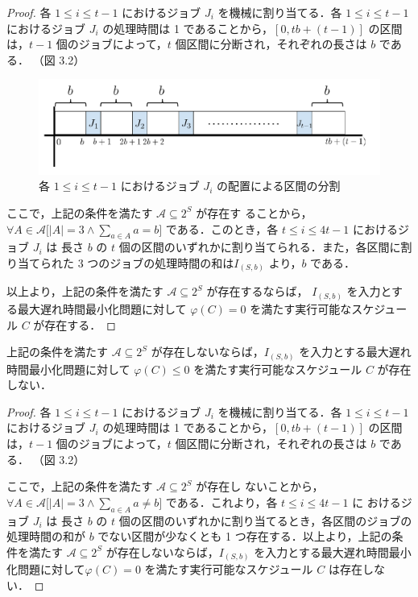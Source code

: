 \documentclass[12pt]{optlab-bachelor}
\begin{document}
\begin{proof}
  各 $1 \le i \le t - 1$ におけるジョブ $J_i$ を機械に割り当てる．各 $1 \le i \le t - 1$ におけるジョブ $J_i$ の処理時間は 1 であることから，$[0, tb + (t - 1)]$ の区間は，$t - 1$ 個のジョブによって，$t$ 個区間に分断され，それぞれの長さは $b$ である．
  （図 3.2）
  \begin{figure}[h]
    \centering
    \includegraphics[width = 14cm]{figure/Lmax.pdf}
    \caption{各 $1 \le i \le t - 1$ におけるジョブ $J_i$ の配置による区間の分割}
  \end{figure}

  ここで，上記の条件を満たす $\mathcal{A} \subseteq 2^S$ が存在す
  ることから，$\forall A \in \mathcal{A}\big[|A| = 3 \land \sum_{a \in
  A}a = b \big]$ である．このとき，各 $t \le i \le 4t - 1$ におけるジョブ $J_{i}$ は 長さ $b$ の $t$ 個の区間のいずれかに割り当てられる．また，各区間に割り当てられた 3 つのジョブの処理時間の和は$I_{(S,b)}$ より，$b$ である．

  以上より，上記の条件を満たす $\mathcal{A} \subseteq 2^S$ が存在するならば，
  $I_{(S,b)}$ を入力とする最大遅れ時間最小化問題に対して $\varphi(C) =
  0$ を満たす実行可能なスケジュール $C$ が存在する．
\end{proof}

\begin{lemma}\label{l_4}
  上記の条件を満たす $\mathcal{A} \subseteq 2^S$ が存在しないならば，$I_{(S,b)}$ を入力とする最大遅れ時間最小化問題に対して $\varphi(C) \le
  0$ を満たす実行可能なスケジュール $C$ が存在しない．
\end{lemma}

\begin{proof}
  各 $1 \le i \le t - 1$ におけるジョブ $J_i$ を機械に割り当てる．各 $1 \le i \le t - 1$ におけるジョブ $J_i$ の処理時間は 1 であることから，$[0, tb + (t - 1)]$ の区間は，$t - 1$ 個のジョブによって，$t$ 個区間に分断され，それぞれの長さは $b$ である．
  （図 3.2）

  ここで，上記の条件を満たす $\mathcal{A} \subseteq 2^S$ が存在し
  ないことから，$\forall A \in \mathcal{A}\big[|A| = 3 \land \sum_{a \in
  A}a \neq b \big]$ である．これより，各 $t \le i \le 4t - 1$ に
  おけるジョブ $J_{i}$ は 長さ $b$ の $t$ 個の区間のいずれかに割り当てるとき，各区間のジョブの処理時間の和が $b$ でない区間が少なくとも 1 つ存在する．以上より，上記の条件を満たす $\mathcal{A} \subseteq 2^S$ が存在しないならば，$I_{(S,b)}$ を入力とする最大遅れ時間最小化問題に対して$\varphi(C) = 0$ を満たす実行可能なスケジュール $C$ は存在しない．
\end{proof}
\end{document}
